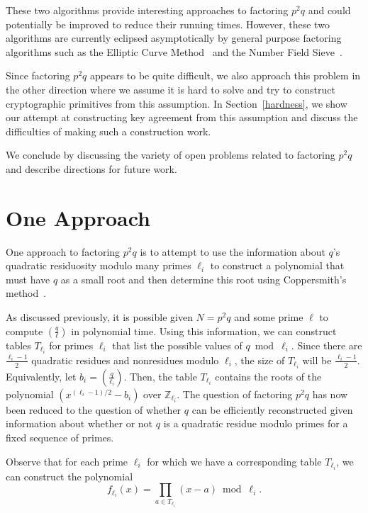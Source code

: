 \documentclass[letterpaper,twocolumn,10pt]{article}
\begin{document}
These two algorithms provide interesting approaches to factoring $p^2 q$ and could potentially be improved to reduce their running times. However, these two algorithms are currently eclipsed asymptotically by general purpose factoring algorithms such as the Elliptic Curve Method~\cite{Lenstra} and the Number Field Sieve~\cite{pomerance}.  

Since factoring $p^2 q$ appears to be quite difficult, we also approach this problem in the other direction where we assume it is hard to solve and try to construct cryptographic primitives from this assumption. In Section~\ref{hardness}, we show our attempt at constructing key agreement from this assumption and discuss the difficulties of making such a construction work. 

We conclude by discussing the variety of open problems related to factoring $p^2 q$ and describe directions for future work.




\section{One Approach}


One approach to factoring $p^2 q$ is to attempt to use the information about $q$'s quadratic residuosity modulo many primes $\ell_i$ to construct a polynomial that must have $q$ as a small root and then determine this root using Coppersmith's method~\cite{Coppersmith}. 

As discussed previously, it is possible given $N = p^2 q$ and some prime $\ell$ to compute $\left(\frac{q}{\ell}\right)$ in polynomial time. Using this information, we can construct tables $T_{\ell_i}$ for primes $\ell_i$ that list the possible values of $q \bmod \ell_i$. Since there are $\frac{\ell_i - 1}{2}$ quadratic residues and nonresidues modulo $\ell_i$, the size of $T_{\ell_i}$ will be $\frac{\ell_i - 1}{2}$. Equivalently, let $b_i =  \left(\frac{q}{\ell_i}\right)$. Then, the table $T_{\ell_i}$ contains the roots of the polynomial $(x^{(\ell_i - 1)/2} - b_i)$ over $\mathbb{Z}_{\ell_i}$. The question of factoring $p^2 q$ has now been reduced to the question of whether $q$ can be efficiently reconstructed given information about whether or not $q$ is a quadratic residue modulo primes for a fixed sequence of primes. 

Observe that for each prime $\ell_i$ for which we have a corresponding table $T_{\ell_i}$, we can construct the polynomial
\[
f_{\ell_i}(x) = \prod_{a \in T_{\ell_i}} (x - a) \bmod \ell_i.
\]
\end{document}
